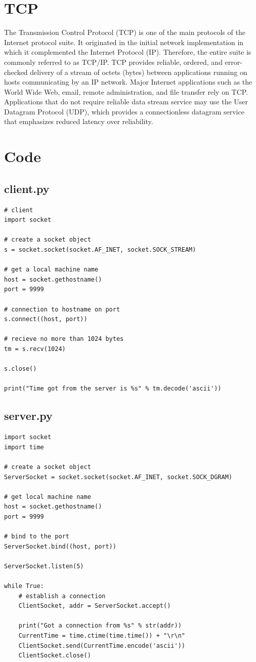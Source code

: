 \documentclass[a4paper,12pt]{article}
\begin{document}
\section{TCP}
The Transmission Control Protocol (TCP) is one of the main protocols of the Internet protocol suite. It originated in the initial network implementation in which it complemented the Internet Protocol (IP). Therefore, the entire suite is commonly referred to as TCP/IP. TCP provides reliable, ordered, and error-checked delivery of a stream of octets (bytes) between applications running on hosts communicating by an IP network. Major Internet applications such as the World Wide Web, email, remote administration, and file transfer rely on TCP. Applications that do not require reliable data stream service may use the User Datagram Protocol (UDP), which provides a connectionless datagram service that emphasizes reduced latency over reliability.

\section{Code} 
\subsection{client.py}
\begin{verbatim}
# client
import socket

# create a socket object
s = socket.socket(socket.AF_INET, socket.SOCK_STREAM)

# get a local machine name
host = socket.gethostname()
port = 9999

# connection to hostname on port
s.connect((host, port)) 

# recieve no more than 1024 bytes
tm = s.recv(1024)

s.close()

print("Time got from the server is %s" % tm.decode('ascii'))
\end{verbatim}
\subsection{server.py}
\begin{verbatim}
import socket
import time

# create a socket object
ServerSocket = socket.socket(socket.AF_INET, socket.SOCK_DGRAM)

# get local machine name
host = socket.gethostname()
port = 9999

# bind to the port
ServerSocket.bind((host, port))

ServerSocket.listen(5)

while True:
    # establish a connection
    ClientSocket, addr = ServerSocket.accept()

    print("Got a connection from %s" % str(addr))
    CurrentTime = time.ctime(time.time()) + "\r\n"
    ClientSocket.send(CurrentTime.encode('ascii'))
    ClientSocket.close()
\end{verbatim}
\end{document}
